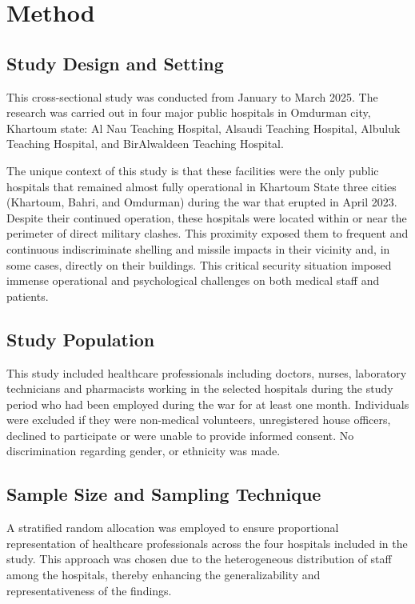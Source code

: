 \documentclass[12pt]{article}
\begin{document}
\section{Method}
\subsection{Study Design and Setting}
This cross-sectional study was conducted from January to March 2025. The research was carried out in four major public hospitals in Omdurman city, Khartoum state: Al Nau Teaching Hospital, Alsaudi Teaching Hospital, Albuluk Teaching Hospital, and BirAlwaldeen Teaching Hospital.

The unique context of this study is that these facilities were the only public hospitals that remained almost fully operational in Khartoum State three cities (Khartoum, Bahri, and Omdurman) during the war that erupted in April 2023. Despite their continued operation, these hospitals were located within or near the perimeter of direct military clashes. This proximity exposed them to frequent and continuous indiscriminate shelling and missile impacts in their vicinity and, in some cases, directly on their buildings. This critical security situation imposed immense operational and psychological challenges on both medical staff and patients.

\subsection{Study Population}
This study included healthcare professionals including doctors, nurses, laboratory technicians and pharmacists working in the selected hospitals during the study period who had been employed during the war for at least one month. Individuals were excluded if they were non-medical volunteers, unregistered house officers, declined to participate or were unable to provide informed consent. No discrimination regarding gender, or ethnicity was made.

\subsection{Sample Size and Sampling Technique}
A stratified random allocation was employed to ensure proportional representation of healthcare professionals across the four hospitals included in the study. This approach was chosen due to the heterogeneous distribution of staff among the hospitals, thereby enhancing the generalizability and representativeness of the findings.
\end{document}
